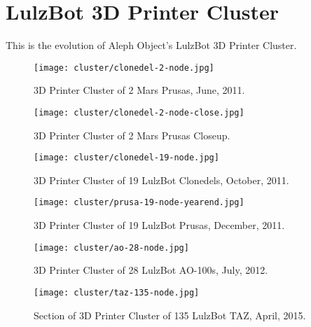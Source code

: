 %
%
%
%
%

\section{LulzBot 3D Printer Cluster}
This is the evolution of Aleph Object's LulzBot 3D Printer Cluster.

\begin{figure}[h!]
\texttt{[image: cluster/clonedel-2-node.jpg]}
 \caption{3D Printer Cluster of 2 Mars Prusas, June, 2011.}
 \label{fig:clonedel-2-node}
\end{figure}

\begin{figure}[h!]
\texttt{[image: cluster/clonedel-2-node-close.jpg]}
 \caption{3D Printer Cluster of 2 Mars Prusas Closeup.}
 \label{fig:clonedel-2-node-close}
\end{figure}

\begin{figure}[h!]
\texttt{[image: cluster/clonedel-19-node.jpg]}
 \caption{3D Printer Cluster of 19 LulzBot Clonedels, October, 2011.}
 \label{fig:clonedel-20-node}
\end{figure}

\begin{figure}[h!]
\texttt{[image: cluster/prusa-19-node-yearend.jpg]}
 \caption{3D Printer Cluster of 19 LulzBot Prusas, December, 2011.}
 \label{fig:prusa-19-node-yearend}
\end{figure}

\begin{figure}[h!]
\texttt{[image: cluster/ao-28-node.jpg]}
 \caption{3D Printer Cluster of 28 LulzBot AO-100s, July, 2012.}
 \label{fig:ao-28-node}
\end{figure}

\begin{figure}[h!]
\texttt{[image: cluster/taz-135-node.jpg]}
 \caption{Section of 3D Printer Cluster of 135 LulzBot TAZ, April, 2015.}
 \label{fig:taz-135-node}
\end{figure}

